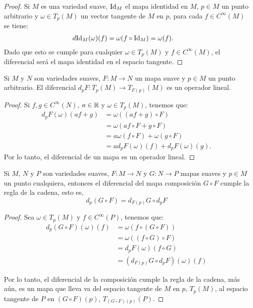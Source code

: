 \begin{proof}
	Si $M$ es una variedad suave, $\mathrm{Id}_M$ el mapa identidad en $M$, $p \in M$ un punto arbitrario y $\omega \in T_p(M)$ un vector tangente de $M$ en $p$, para cada $f \in C^{\infty}(M)$ se tiene:
	\begin{align*}
		d\mathrm{Id}_{M}(\omega)(f) & = \omega(f \circ \mathrm{Id}_M) = \omega(f).
	\end{align*}
	Dado que esto se cumple para cualquier $\omega \in T_p(M)$ y $f \in C^{\infty}(M)$, el diferencial será el mapa identidad en el espacio tangente.
\end{proof}

\begin{lemma}
	Si $M$ y $N$ son variedades suaves, $F: M \to N$ un mapa suave y $p \in M$ un punto arbitrario. El diferencial $d_pF: T_p(M) \to T_{F(p)}(M)$ es un operador lineal.
\end{lemma}

\begin{proof}
	Si $f,g \in C^{\infty}(N)$, $a \in \mathbb{R}$ y $\omega \in T_{p}(M)$, tenemos que:
	\begin{align*}
		d_pF(\omega)(af + g) & = \omega((af + g) \circ F)               \\
		                     & = \omega (af \circ F + g \circ F)        \\
		                     & = a\omega(f \circ F) + \omega(g \circ F) \\
		                     & = a d_pF (\omega)(f) + d_pF(\omega)(g).
	\end{align*}
	Por lo tanto, el diferencial de un mapa es un operador lineal.
\end{proof}

\begin{lemma}\label{Lemma: Regla de la Cadena para Diferenciales}
	Si $M$, $N$ y $P$ son variedades suaves, $F: M \to N$ y $G: N \to P$ mapas suaves y $p \in M$ un punto cualquiera, entonces el diferencial del mapa composición $G \circ F$ cumple la regla de la cadena, esto es,
	\[
		d_p(G \circ F) = d_{F(p)}G \circ d_pF
	\]
\end{lemma}

\begin{proof}
	Sea $\omega \in T_p(M)$ y $f \in C^{\infty}(P)$, tenemos que:
	\begin{align*}
		d_p(G \circ F) (\omega)(f) & = \omega(f \circ (G \circ F))       \\
		                           & = \omega ((f \circ G) \circ F)      \\
		                           & = d_pF(\omega)(f \circ G)           \\
		                           & = (d_{F(p)}G \circ d_pF)(\omega)(f)
	\end{align*}

	Por lo tanto, el diferencial de la composición cumple la regla de la cadena, más aún, es un mapa que lleva va del espacio tangente de $M$
	en $p$, $T_p(M)$, al espacio tangente de $P$ en $(G \circ F)(p)$, $T_{(G \circ F)(p)}(P)$.
\end{proof}

